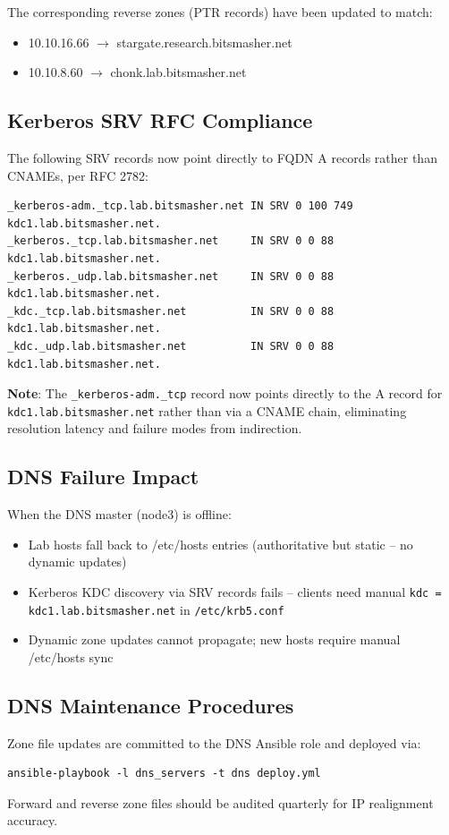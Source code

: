 The corresponding reverse zones (PTR records) have been updated to match:
\begin{itemize}
    \item 10.10.16.66 $\rightarrow$ stargate.research.bitsmasher.net
    \item 10.10.8.60 $\rightarrow$ chonk.lab.bitsmasher.net
\end{itemize}

\subsection{Kerberos SRV RFC Compliance}

The following SRV records now point directly to FQDN A records rather than CNAMEs, per RFC 2782:

\begin{lstlisting}[style=mystyle]
_kerberos-adm._tcp.lab.bitsmasher.net IN SRV 0 100 749 kdc1.lab.bitsmasher.net.
_kerberos._tcp.lab.bitsmasher.net     IN SRV 0 0 88  kdc1.lab.bitsmasher.net.
_kerberos._udp.lab.bitsmasher.net     IN SRV 0 0 88  kdc1.lab.bitsmasher.net.
_kdc._tcp.lab.bitsmasher.net          IN SRV 0 0 88  kdc1.lab.bitsmasher.net.
_kdc._udp.lab.bitsmasher.net          IN SRV 0 0 88  kdc1.lab.bitsmasher.net.
    \end{lstlisting}

\textbf{Note}: The \texttt{_kerberos-adm.\_tcp} record now points directly to the A record for \texttt{kdc1.lab.bitsmasher.net} rather than via a CNAME chain, eliminating resolution latency and failure modes from indirection.

\subsection{DNS Failure Impact}

When the DNS master (node3) is offline:
\begin{itemize}
    \item Lab hosts fall back to /etc/hosts entries (authoritative but static -- no dynamic updates)
    
    \item Kerberos KDC discovery via SRV records fails -- clients need manual \texttt{kdc = kdc1.lab.bitsmasher.net} in \texttt{/etc/krb5.conf}
    
    \item Dynamic zone updates cannot propagate; new hosts require manual /etc/hosts sync
\end{itemize}

\subsection{DNS Maintenance Procedures}

Zone file updates are committed to the DNS Ansible role and deployed via:
\begin{lstlisting}[style=mystyle]
ansible-playbook -l dns_servers -t dns deploy.yml
    \end{lstlisting}

Forward and reverse zone files should be audited quarterly for IP realignment accuracy.
